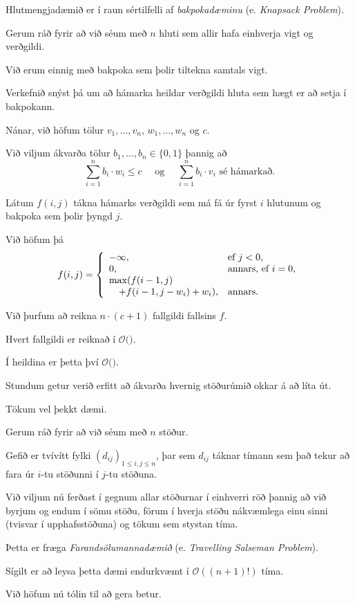 {
	{
		\item<1-> Hlutmengjadæmið er í raun sértilfelli af \emph{bakpokadæminu} (e. \emph{Knapsack Problem}).
		\item<2-> Gerum ráð fyrir að við séum með $n$ hluti sem allir hafa einhverja vigt og verðgildi.
		\item<3-> Við erum einnig með bakpoka sem þolir tiltekna samtals vigt.
		\item<4-> Verkefnið snýst þá um að hámarka heildar verðgildi hluta sem hægt er að setja í bakpokann.
	}
}

{
	{
		\item<1-> Nánar, við höfum tölur $v_1, \dots, v_n$, $w_1, \dots, w_n$ og $c$.
		\item<2-> Við viljum ákvarða tölur $b_1, \dots, b_n \in \{0, 1\}$ þannig að
		\[
			\sum_{i = 1}^n b_i \cdot w_i \leq c
			\quad \text{ og } \quad
			\sum_{i = 1}^n b_i \cdot v_i \text{ sé hámarkað}.
		\]
		\item<3-> Látum $f(i, j)$ tákna hámarks verðgildi sem má fá úr fyrst $i$ hlutunum og bakpoka sem þolir þyngd $j$.
		\item<4-> Við höfum þá
		\[
			f(i, j) =
			\left \{
			\env{array}
			{
				{l l}
				-\infty, & \text{ef $j < 0$},\\
				0, & \text{annars, ef $i = 0$},\\
				\max(f(i - 1, j) \\
						\quad + f(i - 1, j - w_i) + w_i), & \text{annars}.
			}
			\right .
		\]
	}
}

{
}

{
	{
		\item<1-> Við þurfum að reikna $n \cdot (c + 1)$ fallgildi fallsins $f$.
		\item<2-> Hvert fallgildi er reiknað í $\mathcal{O}($\onslide<3->{$\,1\,$}$)$.
		\item<4-> Í heildina er þetta því $\mathcal{O}($\onslide<5->{$n \cdot c$}$)$.
	}
}

{
	{
		\item<1-> Stundum getur verið erfitt að ákvarða hvernig stöðurúmið okkar á að líta út.
		\item<2-> Tökum vel þekkt dæmi.
		\item<3-> Gerum ráð fyrir að við séum með $n$ stöður.
		\item<4-> Gefið er tvívítt fylki $(d_{ij})_{1 \leq i, j \leq n}$,
					þar sem $d_{ij}$ táknar tímann sem það tekur að fara úr $i$-tu stöðunni í $j$-tu stöðuna.
		\item<5-> Við viljum nú ferðast í gegnum allar stöðurnar í einhverri röð þannig að við	
					byrjum og endum í sömu stöðu, förum í hverja stöðu nákvæmlega einu sinni (tvisvar í upphafsstöðuna) og tökum sem stystan tíma.
		\item<6-> Þetta er fræga \emph{Farandsölumannadæmið} (e. \emph{Travelling Salseman Problem}).
		\item<7-> Sígilt er að leysa þetta dæmi endurkvæmt í $\mathcal{O}((n + 1)!)$ tíma.
		\item<8-> Við höfum nú tólin til að gera betur.
	}
}

